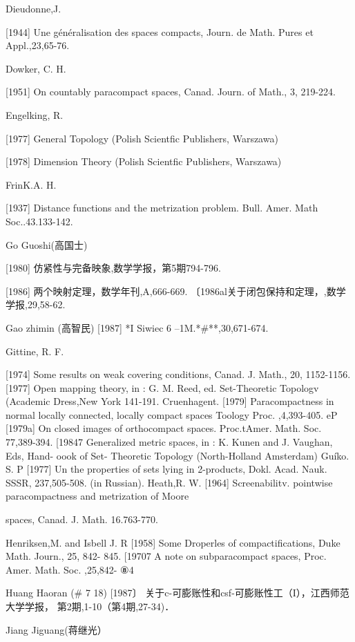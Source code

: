 \documentclass[main.tex]{subfiles}
\begin{document}
\noindent Dieudonne,J.

[1944] Une généralisation des spaces compacts, Journ. de Math. Pures et Appl.,23,65-76.

\noindent Dowker, C. H.

[1951] On countably paracompact spaces, Canad. Journ. of Math., 3, 219-224.

\noindent Engelking, R.

[1977] General Topology (Polish Scientfic Publishers, Warszawa)

[1978] Dimension Theory (Polish Scientfic Publishers, Warszawa)


\noindent FrinK.A. H.

[1937] Distance functions and the metrization problem. Bull. Amer. Math
Soc..43.133-142.

\noindent Go Guoshi(高国士)

[1980] 仿紧性与完备映象,数学学报，第5期794-796.

[1986] 两个映射定理，数学年刊,A,666-669.
〔1986al关于闭包保持和定理，,数学学报,29,58-62.

\noindent Gao zhimin (高智民)
[1987] *I Siwiec 6 --1M.*\#**,30,671-674.

\noindent Gittine, R. F.

[1974]
Some results on weak covering conditions, Canad. J. Math., 20,
1152-1156.
[1977]
Open mapping theory, in : G. M. Reed, ed. Set-Theoretic Topologv
(Academic Dress,New York 141-191.
Cruenhagent.
[1979]
Paracompactness in normal locally connected,
locally compact
spaces Toology Proc.
,4,393-405.
eP [1979a]
On closed images of orthocompact
spaces. Proc.tAmer. Math. Soc.
77,389-394.
[19847 Generalized metric spaces, in : K. Kunen and J. Vaughan, Eds, Hand-
oook of Set- Theoretic Topology (North-Holland Amsterdam)
Guíko. S. P
[1977]
Un
the properties of sets lying in 2-products, Dokl. Acad. Nauk.
SSSR, 237,505-508. (in Russian).
Heath,R. W.
[1964]
Screenabilitv. pointwise paracompactness and
metrization of Moore

spaces, Canad. J. Math. 16.763-770.

\noindent Henriksen,M. and Isbell J. R
[1958]
Some Droperles
of compactifications, Duke Math. Journ., 25, 842-
845.
[19707 A note on subparacompact spaces, Proc. Amer. Math. Soc. ,25,842-
⑧4

\noindent Huang Haoran (# 7 18)
[1987〕 关于c-可膨账性和csf-可膨账性工（I），江西师范大学学报，
第2期,1-10（第4期,27-34)．

\noindent Jiang Jiguang(蒋继光）
\end{document}
